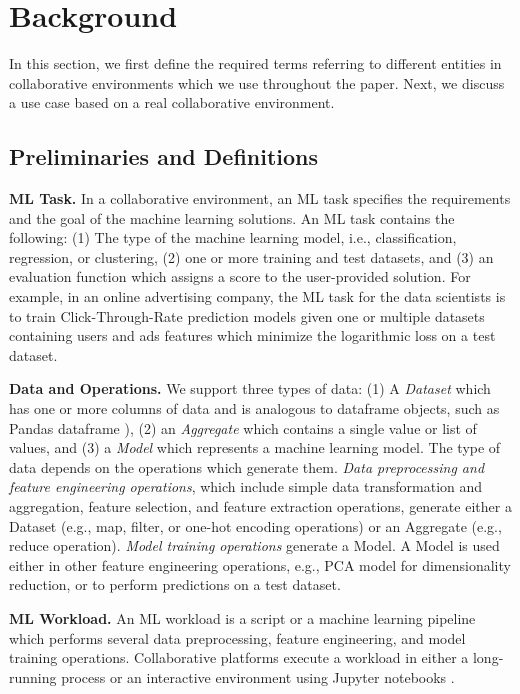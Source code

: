 \section{Background} \label{sec-background}
In this section, we first define the required terms referring to different entities in collaborative environments which we use throughout the paper.
Next, we discuss a use case based on a real collaborative environment.

\subsection{Preliminaries and Definitions}
\textbf{ML Task.} 
In a collaborative environment, an ML task specifies the requirements and the goal of the machine learning solutions.
An ML task contains the following: (1) The type of the machine learning model, i.e., classification, regression, or clustering, (2) one or more training and test datasets, and (3) an evaluation function which assigns a score to the user-provided solution.
For example, in an online advertising company, the ML task for the data scientists is to train Click-Through-Rate prediction models given one or multiple datasets containing users and ads features which minimize the logarithmic loss on a test dataset.

\textbf{Data and Operations.}
We support three types of data: (1) A \textit{Dataset} which has one or more columns of data and is analogous to dataframe objects, such as Pandas dataframe \cite{mckinney-proc-scipy-2010}), (2) an \textit{Aggregate} which contains a single value or list of values, and (3) a \textit{Model} which represents a machine learning model.
The type of data depends on the operations which generate them.
\textit{Data preprocessing and feature engineering operations}, which include simple data transformation and aggregation, feature selection, and feature extraction operations, generate either a Dataset (e.g., map, filter, or one-hot encoding operations)  or an Aggregate (e.g., reduce operation).
\textit{Model training operations} generate a Model.
A Model is used either in other feature engineering operations, e.g., PCA model for dimensionality reduction, or to perform predictions on a test dataset.
 
\textbf{ML Workload.}
An ML workload is a script or a machine learning pipeline which performs several data preprocessing, feature engineering, and model training operations. 
Collaborative platforms execute a workload in either a long-running process or an interactive environment using Jupyter notebooks \cite{Kluyver:2016aa}.

